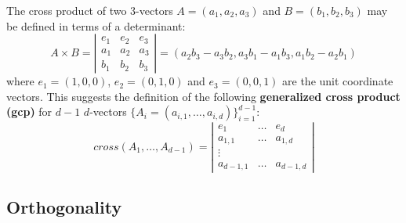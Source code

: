\documentclass[10pt]{article}
\begin{document}
The cross product of two 3-vectors $A = (a_1,a_2,a_3)$ and $B = (b_1,b_2,b_3)$
may be defined in terms of a determinant:
\[
A \times B = 
\left|
\begin{array}{ccc}
e_1 & e_2 & e_3 \\
a_1 & a_2 & a_3 \\
b_1 & b_2 & b_3
\end{array}
\right|
= (a_2b_3 - a_3b_2, a_3b_1 - a_1b_3, a_1b_2 - a_2b_1)
\]
where $e_1 = (1,0,0)$, $e_2 = (0,1,0)$ and $e_3 = (0,0,1)$ are the 
unit coordinate vectors.
This suggests the definition of the following {\bf generalized cross product (gcp)} for $d-1$ $d$-vectors
$\{A_i = (a_{i,1},\ldots,a_{i,d})\}_{i=1}^{d-1}$:
\begin{equation}
\label{eqn:gcp}
cross (A_1,\ldots,A_{d-1}) = 
\left|
\begin{array}{ccc}
e_1 & \ldots & e_d \\
a_{1,1} & \ldots & a_{1,d} \\
\vdots \\
a_{d-1,1} & \ldots & a_{d-1,d} 
\end{array}
\right|
\end{equation}

\subsection{Orthogonality}
\end{document}
